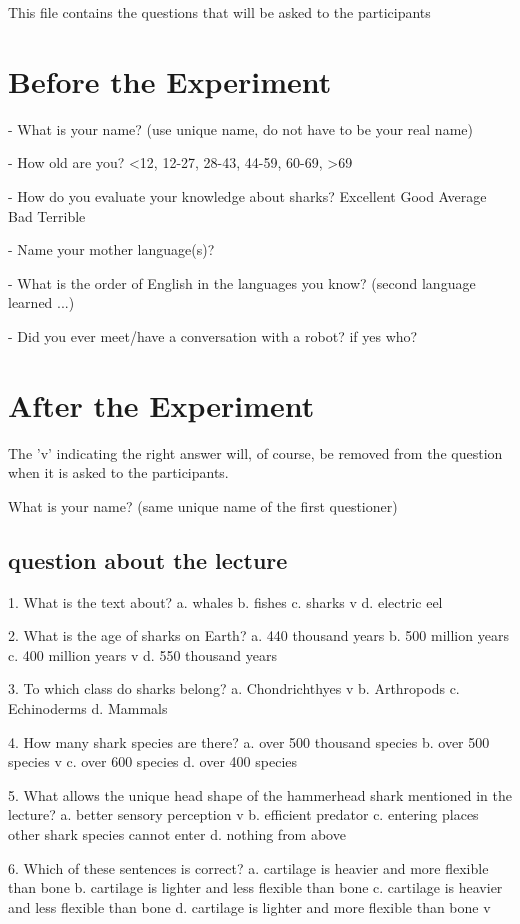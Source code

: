 This file contains the questions that will be asked to the participants

\section{Before the Experiment}
- What is your name? (use unique name, do not have to be your real name)

- How old are you? <12, 12-27, 28-43, 44-59, 60-69, >69

- How do you evaluate your knowledge about sharks?
Excellent
Good
Average
Bad
Terrible

- Name your mother language(s)?

- What is the order of English in the languages you know? (second language learned ...)

- Did you ever meet/have a conversation with a robot? if yes who?

\section{After the Experiment}
The 'v' indicating the right answer will, of course, be removed from the question when it is asked to the participants.

What is your name? (same unique name of the first questioner) 
\subsection{question about the lecture}
1. What is the text about?
a. whales
b. fishes
c. sharks v
d. electric eel

2. What is the age of sharks on Earth?
a. 440 thousand years
b. 500 million years
c. 400 million years v
d. 550 thousand years

3. To which class do sharks belong?
a. Chondrichthyes v
b. Arthropods
c. Echinoderms
d. Mammals

4. How many shark species are there?
a. over 500 thousand species
b. over 500 species v
c. over 600 species
d. over 400 species

5. What allows the unique head shape of the hammerhead shark mentioned in the lecture?
a. better sensory perception v
b. efficient predator
c. entering places other shark species cannot enter
d. nothing from above

6. Which of these sentences is correct?
a. cartilage is heavier and more flexible than bone
b. cartilage is lighter and less flexible than bone
c. cartilage is heavier and less flexible than bone
d. cartilage is lighter and more flexible than bone v

